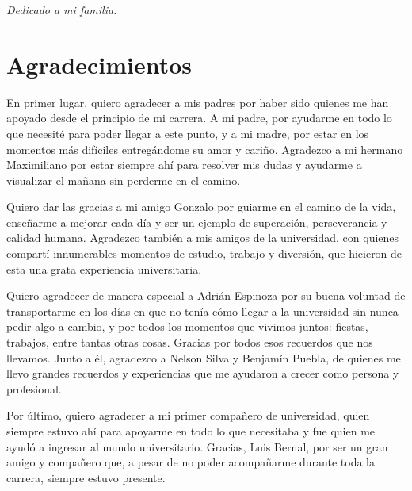 \documentclass{iccmemoria}
\author{Agustin Eduardo Meza Mella}
\date{Junio, 2026}
\begin{document}
\maketitle

\thispagestyle{empty}
\null\vfill
\begin{center}
\Large\itshape Dedicado a mi familia.
\end{center}
\vfill\null
\clearpage

\thispagestyle{empty}
\chapter*{Agradecimientos}

En primer lugar, quiero agradecer a mis padres por haber sido quienes me han apoyado
desde el principio de mi carrera. A mi padre, por ayudarme en todo lo que necesité
para poder llegar a este punto, y a mi madre, por estar en los momentos más difíciles
entregándome su amor y cariño. Agradezco a mi hermano Maximiliano por estar
siempre ahí para resolver mis dudas y ayudarme a visualizar el mañana sin perderme
en el camino.

Quiero dar las gracias a mi amigo Gonzalo por guiarme en el camino de la vida,
enseñarme a mejorar cada día y ser un ejemplo de superación, perseverancia y calidad
humana. Agradezco también a mis amigos de la universidad, con quienes compartí
innumerables momentos de estudio, trabajo y diversión, que hicieron de esta una grata
experiencia universitaria.

Quiero agradecer de manera especial a Adrián Espinoza por su buena voluntad de
transportarme en los días en que no tenía cómo llegar a la universidad sin nunca pedir
algo a cambio, y por todos los momentos que vivimos juntos: fiestas, trabajos, entre
tantas otras cosas. Gracias por todos esos recuerdos que nos llevamos. Junto a él,
agradezco a Nelson Silva y Benjamín Puebla, de quienes me llevo grandes recuerdos y
experiencias que me ayudaron a crecer como persona y profesional.

Por último, quiero agradecer a mi primer compañero de universidad, quien siempre
estuvo ahí para apoyarme en todo lo que necesitaba y fue quien me ayudó a ingresar al
mundo universitario. Gracias, Luis Bernal, por ser un gran amigo y compañero que, a
pesar de no poder acompañarme durante toda la carrera, siempre estuvo presente.

\clearpage
\end{document}
